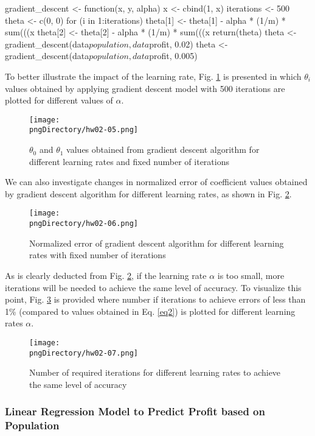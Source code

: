 \documentclass[12pt,letterpaper,twoside]{article}
\begin{document}
\begin{terminal}
gradient_descent <- function(x, y, alpha) {
	x <- cbind(1, x)
	iterations <- 500
	theta <- c(0, 0)
	for (i in 1:iterations)
	{
		theta[1] <- theta[1] - alpha * (1/m) * sum(((x%
		theta[2] <- theta[2] - alpha * (1/m) * sum(((x%
	}
	return(theta)
}
theta <- gradient_descent(data$population, data$profit, 0.02)
theta <- gradient_descent(data$population, data$profit, 0.005)
\end{terminal}

To better illustrate the impact of the learning rate, Fig. \ref{fig3} is presented in which $\theta_i$ values obtained by applying gradient descent model with 500 iterations are plotted for different values of $\alpha$.

\begin{figure}\centering
\texttt{[image: \\pngDirectory/hw02-05.png]}
\caption{$\theta_0$ and $\theta_1$ values obtained from gradient descent algorithm for different learning rates and fixed number of iterations}\label{fig3}
\end{figure}

We can also investigate changes in normalized error of coefficient values obtained by gradient descent algorithm for different learning rates, as shown in Fig. \ref{fig4}.

\begin{figure}\centering
\texttt{[image: \\pngDirectory/hw02-06.png]}
\caption{Normalized error of gradient descent algorithm for different learning rates with fixed number of iterations}\label{fig4}
\end{figure}

As is clearly deducted from Fig. \ref{fig4}, if the learning rate $\alpha$ is too small, more iterations will be needed to achieve the same level of accuracy.
To visualize this point, Fig. \ref{fig5} is provided where number if iterations to achieve errors of less than 1\% (compared to values obtained in Eq. \ref{eq2}) is plotted for different learning rates $\alpha$.

\begin{figure}\centering
\texttt{[image: \\pngDirectory/hw02-07.png]}
\caption{Number of required iterations for different learning rates to achieve the same level of accuracy}\label{fig5}
\end{figure}

\newpage

\subsubsection*{Linear Regression Model to Predict Profit based on Population}
\end{document}
